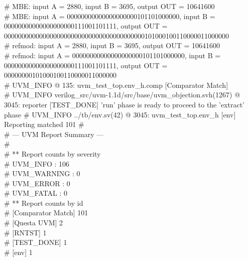 \# MBE: input A =       2880, input B =       3695, output OUT =             10641600\\
\# MBE: input A = 00000000000000000000101101000000, input B = 00000000000000000000111001101111, output OUT = 0000000000000000000000000000000000000000101000100110000011000000\\
\# refmod: input A =        2880, input B =        3695, output OUT =    10641600\\
\# refmod: input A = 00000000000000000000101101000000, input B = 00000000000000000000111001101111, output OUT = 00000000101000100110000011000000\\
\# UVM\_INFO @ 135: uvm\_test\_top.env\_h.comp [Comparator Match] \\
\# UVM\_INFO verilog\_src/uvm-1.1d/src/base/uvm\_objection.svh(1267) @ 3045: reporter [TEST\_DONE] 'run' phase is ready to proceed to the 'extract' phase
\# UVM\_INFO ../tb/env.sv(42) @ 3045: uvm\_test\_top.env\_h [env] Reporting matched 101
\# \\
\# --- UVM Report Summary ---\\
\# \\
\# ** Report counts by severity\\
\# UVM\_INFO :  106\\
\# UVM\_WARNING :    0\\
\# UVM\_ERROR :    0\\
\# UVM\_FATAL :    0\\
\# ** Report counts by id\\
\# [Comparator Match]   101\\
\# [Questa UVM]     2\\
\# [RNTST]     1\\
\# [TEST\_DONE]     1\\
\# [env]     1\\
